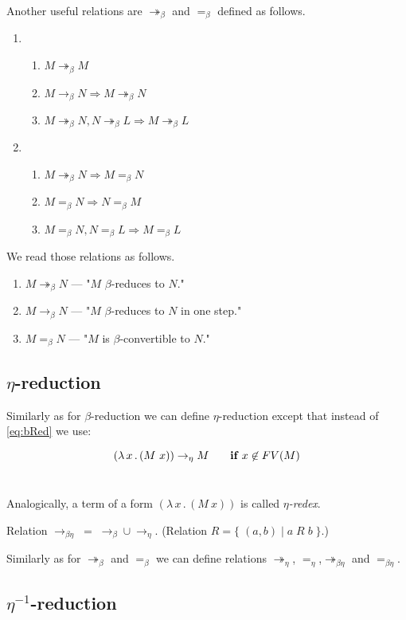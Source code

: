 \documentclass{sig-alternate}
\newcommand{\then}{\Rightarrow\xspace}
\newcommand{\lamb}[2]{( \lambda \, #1 \, . \, #2 )}
\newcommand{\bbarr}{\twoheadrightarrow_\beta}
\newcommand{\barr}{\rightarrow_\beta}
\newcommand{\beq}{=_\beta}
\newcommand{\eearr}{\twoheadrightarrow_\eta}
\newcommand{\earr}{\rightarrow_\eta}
\newcommand{\eeq}{=_\eta}
\newcommand{\bearr}{\rightarrow_{\beta\eta}}
\newcommand{\bbeearr}{\twoheadrightarrow_{\beta\eta}}
\newcommand{\beeq}{=_{\beta\eta}}
\begin{document}
Another useful relations are $\bbarr$ and $\beq$ defined as follows. 

\begin{enumerate}
 \item \begin{enumerate}
 	\item $M \bbarr M$
 	\item $M \barr N \then M \bbarr N$
 	\item $M \bbarr N , N \bbarr L \then M \bbarr L$ 	
 \end{enumerate}
 \item \begin{enumerate}
 	\item $M \bbarr N \then M \beq N$
 	\item $M \beq N \then N \beq M$
 	\item $M \beq N , N \beq L \then M \beq L$
 \end{enumerate}

\end{enumerate}

We read those relations as follows.
\begin{enumerate}
 	\item $M \bbarr N$ --- "$M$ $\beta$-reduces to $N$."  
 	\item $M \barr N$  --- "$M$ $\beta$-reduces to $N$
 	      in one step."
 	\item $M \beq N$ --- "$M$ is $\beta$-convertible to $N$."	
 \end{enumerate}



\subsection{$\eta$-reduction}

Similarly as for $\beta$-reduction we can define $\eta$-reduction 
except that instead of \ref{eq:bRed} we use:  

$$\lamb{x}{(M~x)} \eArrow M \textbf{ ~~~~if } x \not\in FV(M) $$~

Analogically, a term of a form $\lamb{x}{(M~x)}$ is called 
\textit{$\eta$-redex}.

Relation $\bearr\;=\;\barr \cup \earr$. 
(Relation $R = \{\;(a,b)\;|\;a\;R\;b\;\}$.)

Similarly as for $\bbarr$ and $\beq$ we can define relations 
$\eearr$, $\eeq$,$\bbeearr$ and $\beeq$.


\subsection{$\eta^{-1}$-reduction}
\end{document}
